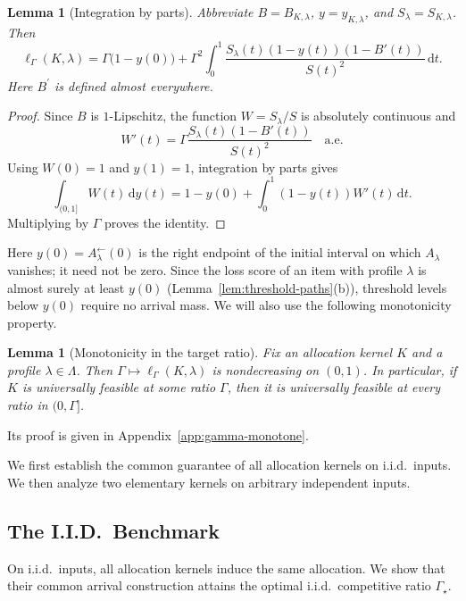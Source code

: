 \documentclass[11pt]{article}
\newtheorem{lemma}[theorem]{Lemma}
\theoremstyle{definition}
\theoremstyle{remark}
\newcommand{\dd}{\,\mathrm d}
\begin{document}
\begin{lemma}[Integration by parts]\label{lem:load-parts}
Abbreviate $B=B_{K,\lambda}$, $y=y_{K,\lambda}$, and $S_\lambda=S_{K,\lambda}$.
Then
\begin{equation}\label{eq:load-parts}
 \ell_\Gamma(K,\lambda)
 =\Gamma\bigl(1-y(0)\bigr)
  +\Gamma^2\int_0^1
   \frac{S_\lambda(t)(1-y(t))(1-B'(t))}{S(t)^2}\dd t.
\end{equation}
Here $B^\prime$ is defined almost everywhere.
\end{lemma}
\begin{proof}
Since $B$ is $1$-Lipschitz, the function $W=S_\lambda/S$ is absolutely continuous and
\[
 W'(t)=\Gamma\frac{S_\lambda(t)(1-B'(t))}{S(t)^2}
 \quad\text{a.e.}
\]
Using $W(0)=1$ and $y(1)=1$, integration by parts gives
\[
 \int_{(0,1]}W(t)\dd y(t)
 =1-y(0)+\int_0^1(1-y(t))W'(t)\dd t.
\]
Multiplying by $\Gamma$ proves the identity.
\end{proof}

Here $y(0)=A_\lambda^{\leftarrow}(0)$ is the right endpoint of the initial interval on which $A_\lambda$ vanishes; it need not be zero.
Since the loss score of an item with profile $\lambda$ is almost surely at least $y(0)$ (Lemma~\ref{lem:threshold-paths}(b)), threshold levels below $y(0)$ require no arrival mass.
We will also use the following monotonicity property.

\begin{lemma}[Monotonicity in the target ratio]\label{lem:gamma-monotone}
Fix an allocation kernel $K$ and a profile $\lambda\in\Lambda$.
Then $\Gamma\mapsto\ell_\Gamma(K,\lambda)$ is nondecreasing on $(0,1)$.
In particular, if $K$ is universally feasible at some ratio $\Gamma$, then it is universally feasible at every ratio in $(0,\Gamma]$.
\end{lemma}

Its proof is given in Appendix~\ref{app:gamma-monotone}.

We first establish the common guarantee of all allocation kernels on
i.i.d.\ inputs.  We then analyze two elementary kernels on arbitrary
independent inputs.

\subsection{The I.I.D.\ Benchmark}\label{sec:iid-blind}

On i.i.d.\ inputs, all allocation kernels induce the same allocation.
We show that their common arrival construction attains the optimal
i.i.d.\ competitive ratio $\Gamma_\star$.
\end{document}
